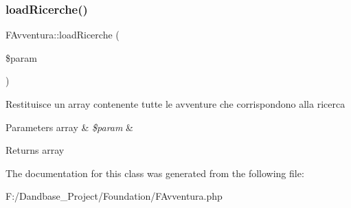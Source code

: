 \subsubsection{\texorpdfstring{load\+Ricerche()}{loadRicerche()}}
{\footnotesize\ttfamily F\+Avventura\+::load\+Ricerche (\begin{DoxyParamCaption}\item[{}]{\$param }\end{DoxyParamCaption})}

Restituisce un array contenente tutte le avventure che corrispondono alla ricerca


\begin{DoxyParams}[1]{Parameters}
array & {\em \$param} & \\
\hline
\end{DoxyParams}
\begin{DoxyReturn}{Returns}
array 
\end{DoxyReturn}


The documentation for this class was generated from the following file\+:\begin{DoxyCompactItemize}
\item 
F\+:/\+Dandbase\+\_\+\+Project/\+Foundation/F\+Avventura.\+php\end{DoxyCompactItemize}
